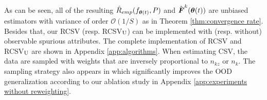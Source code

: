 \documentclass{article} %
\newcommand{\btheta}{\text{\boldmath{$\theta$}}}
\newcommand{\bx}{\boldsymbol{x}}
\newcommand{\bF}{\boldsymbol{F}}
\newcommand{\bu}{\boldsymbol{u}}
\newcommand{\cL}{\mathcal{L}}
\newcommand{\cI}{\mathcal{I}}
\newcommand{\cO}{\mathcal{O}}
\begin{document}
	\par
	As can be seen, all of the resulting $\hat{R}_{emp}(f_{\btheta(t)}, P)$ and $\hat{\bF}^{k}(\btheta(t))$ are unbiased estimators with variance of order $\cO(1/S)$ as in Theorem \ref{thm:convergence rate}. Besides that, our RCSV (resp. RCSV$_{\rm U}$) can be implemented with (resp. without) observable spurious attributes. The complete implementation of RCSV and RCSV$_{\rm U}$ are shown in Appendix \ref{app:algorithms}. When estimating CSV, the data are sampled with weights that are inversely proportional to $n_{kz}$ or $n_{k}$. The sampling strategy also appears in \citep{sagawa2019distributionally,idrissi2021simple,arjovsky2019invariant} which significantly improves the OOD generalization according to our ablation study in Appendix \ref{app:experiments without reweighting}.
	\par
\end{document}
